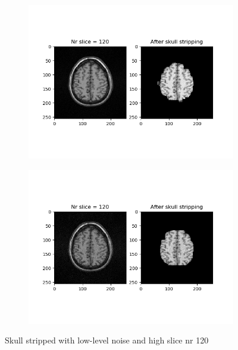 \begin{figure}[H]
	\centering
	\begin{subfigure}[b]{0.35\linewidth}
		\includegraphics[scale=0.35]{figures/Module_08/M8_13.png}
	\end{subfigure}
		\begin{subfigure}[b]{0.35\linewidth}
		\includegraphics[scale=0.35]{figures/Module_08/M8_n13.png}
	\end{subfigure}
	\caption{Skull stripped with low-level noise and high slice nr 120}
	\label{fig:figures/m08_13}
\end{figure}


